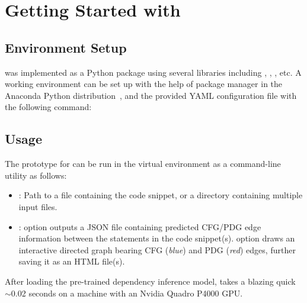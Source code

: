 

\section{Getting Started with \tool}
\subsection{Environment Setup}
\tool was implemented as a Python package using 
several libraries including , , ,
etc. A working environment can be set up with the help of 
 package manager in the Anaconda Python distribution~\cite{anaconda}, 
and the provided YAML configuration file with the following 
command: 

\subsection{Usage}
The prototype for \tool can be run in the virtual environment as a command-line utility as follows:

\noindent {}
\begin{itemize}
    \item {}: Path to a  file containing the code snippet, or a directory containing multiple input  files. 
    \item {}:  option outputs a JSON file containing predicted CFG/PDG edge information between the statements in the code snippet(s).  option draws an interactive directed graph bearing CFG (\textit{blue}) and PDG (\textit{red}) edges, further saving it as an HTML file(s). 
\end{itemize}

After loading the pre-trained dependency inference model, \tool takes a blazing quick 
$\sim$0.02 seconds on a machine with an Nvidia Quadro P4000 GPU.

